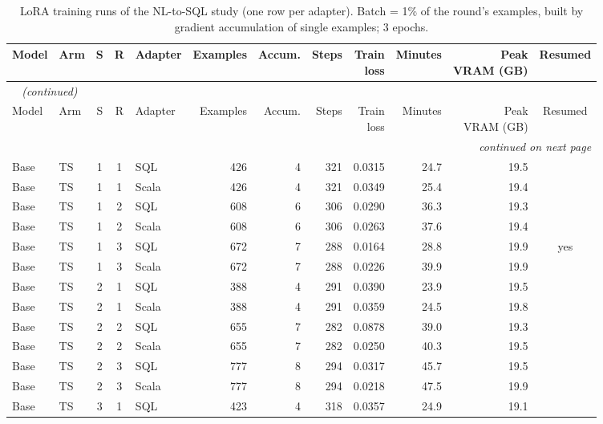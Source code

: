 {\footnotesize
{}
\setlength{\tabcolsep}{4.2pt}
\begin{longtable}{@{}llcclrrrrrrc@{}}
\caption{LoRA training runs of the NL-to-SQL study (one row per adapter). Batch = 1\% of the round's examples, built by gradient accumulation of single examples; 3 epochs.}\label{tab:gen-training}\\
\toprule
\rowcolor{headshade}Model & Arm & S & R & Adapter & Examples & Accum. & Steps & \makecell{Train\\loss} & Minutes & \makecell{Peak\\VRAM (GB)} & Resumed\\
\midrule
\endfirsthead
\multicolumn{12}{l}{\textit{\tablename~\thetable{} (continued)}}\\
\toprule
\rowcolor{headshade}Model & Arm & S & R & Adapter & Examples & Accum. & Steps & \makecell{Train\\loss} & Minutes & \makecell{Peak\\VRAM (GB)} & Resumed\\
\midrule
\endhead
\midrule
\multicolumn{12}{r}{\textit{continued on next page}}\\
\endfoot
\bottomrule
\endlastfoot
Base & TS & 1 & 1 & SQL & 426 & 4 & 321 & 0.0315 & 24.7 & 19.5 & \\
Base & TS & 1 & 1 & Scala & 426 & 4 & 321 & 0.0349 & 25.4 & 19.4 & \\
Base & TS & 1 & 2 & SQL & 608 & 6 & 306 & 0.0290 & 36.3 & 19.3 & \\
Base & TS & 1 & 2 & Scala & 608 & 6 & 306 & 0.0263 & 37.6 & 19.4 & \\
Base & TS & 1 & 3 & SQL & 672 & 7 & 288 & 0.0164 & 28.8 & 19.9 & yes\\
Base & TS & 1 & 3 & Scala & 672 & 7 & 288 & 0.0226 & 39.9 & 19.9 & \\
Base & TS & 2 & 1 & SQL & 388 & 4 & 291 & 0.0390 & 23.9 & 19.5 & \\
Base & TS & 2 & 1 & Scala & 388 & 4 & 291 & 0.0359 & 24.5 & 19.8 & \\
Base & TS & 2 & 2 & SQL & 655 & 7 & 282 & 0.0878 & 39.0 & 19.3 & \\
Base & TS & 2 & 2 & Scala & 655 & 7 & 282 & 0.0250 & 40.3 & 19.5 & \\
Base & TS & 2 & 3 & SQL & 777 & 8 & 294 & 0.0317 & 45.7 & 19.5 & \\
Base & TS & 2 & 3 & Scala & 777 & 8 & 294 & 0.0218 & 47.5 & 19.9 & \\
Base & TS & 3 & 1 & SQL & 423 & 4 & 318 & 0.0357 & 24.9 & 19.1 & \\

\end{longtable}}
